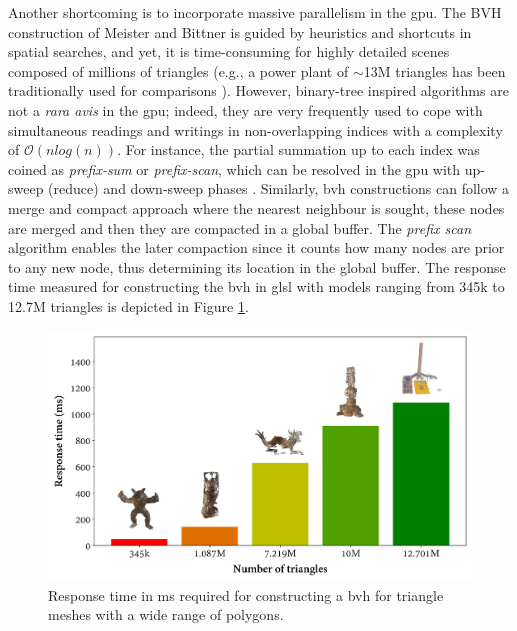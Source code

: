 Another shortcoming is to incorporate massive parallelism in the \acrshort{gpu}. The BVH construction of Meister and Bittner \cite{meister_parallel_2018} is guided by heuristics and shortcuts in spatial searches, and yet, it is time-consuming for highly detailed scenes composed of millions of triangles (e.g., a power plant of $\sim$13M triangles has been traditionally used for comparisons \cite{mcguire_computer_2017}). However, binary-tree inspired algorithms are not a \textit{rara avis} in the \acrshort{gpu}; indeed, they are very frequently used to cope with simultaneous readings and writings in non-overlapping indices with a complexity of $\mathcal{O}(n \textit{log}(n))$. For instance, the partial summation up to each index was coined as \textit{prefix-sum} or \textit{prefix-scan}, which can be resolved in the \acrshort{gpu} with up-sweep (reduce) and down-sweep phases \cite{nguyen_gpu_2007}. Similarly, \acrshort{bvh} constructions can follow a merge and compact approach where the nearest neighbour is sought, these nodes are merged and then they are compacted in a global buffer. The \textit{prefix scan} algorithm enables the later compaction since it counts how many nodes are prior to any new node, thus determining its location in the global buffer. The response time measured for constructing the \acrshort{bvh} in \acrshort{glsl} with models ranging from 345k to 12.7M triangles is depicted in Figure \ref{fig:bvh_time}. 

\begin{figure}[ht]
    \includegraphics{figs/fundamentals/bvh_time.png}
	\caption{Response time in \si{\milli\second} required for constructing a \acrshort{bvh} for triangle meshes with a wide range of polygons. }
    \label{fig:bvh_time}
\end{figure}

